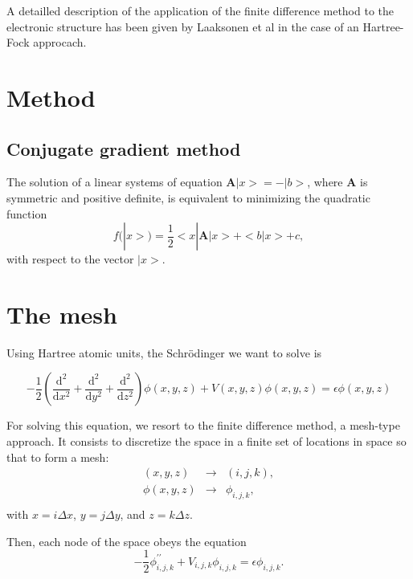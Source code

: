 \documentclass[11pt,a4paper]{article}
\begin{document}
A detailled description of the application of the finite difference method to the electronic structure has been given by Laaksonen et al in the case of an Hartree-Fock approcach\cite{laaksonen1986}.

\section{Method}

\subsection{Conjugate gradient method}

The solution of a linear systems of equation $\bm{A}|x>=-|b>$, where $\bm{A}$ is symmetric and positive definite, is equivalent to minimizing the quadratic function
\begin{equation}
  f(|x>)=\frac{1}{2}<x|\bm{A}|x>+<b|x>+c,
\end{equation}
with respect to the vector $|x>$.


\section{The mesh}

Using Hartree atomic units, the Schr\"odinger we want to solve is 


\begin{equation}
  \label{eq:1}
  -\frac{1}{2}\left(\frac{\mathrm{d}^2}{\mathrm{d}x^2}+\frac{\mathrm{d}^2}{\mathrm{d}y^2}+\frac{\mathrm{d}^2}{\mathrm{d}z^2}\right)\phi(x,y,z)+V(x,y,z)\phi(x,y,z)=\epsilon\phi(x,y,z)
\end{equation}

For solving this equation, we resort to the finite difference method, a mesh-type approach\cite{varga2011,mazumder2015}.
It consists to discretize the space in a finite set of locations in space so that to form a mesh:
\begin{eqnarray}
  (x,y,z)&\rightarrow& (i,j,k), \\
  \phi(x,y,z)&\rightarrow& \phi_{i,j,k}, \\
\end{eqnarray}
with $x=i\Delta x$, $y=j\Delta y$, and $z=k\Delta z$.

Then, each node of the space obeys the equation
\begin{equation}
  \label{eq:eq1}
  -\frac{1}{2}\phi^{\prime\prime}_{i,j,k}+V_{i,j,k}\phi_{i,j,k}=\epsilon\phi_{i,j,k}.
\end{equation}
\end{document}
